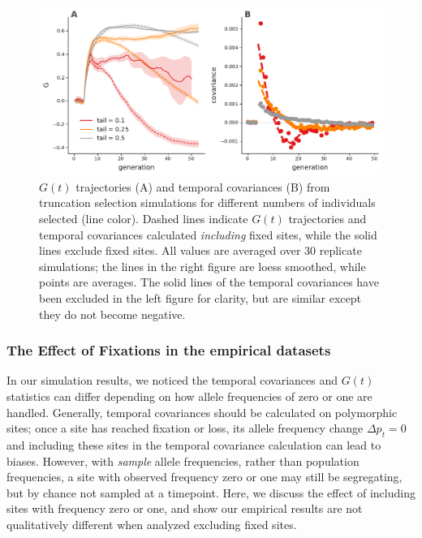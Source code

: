 \documentclass[11pt]{article}
\begin{document}
\begin{figure}[!ht]
  \centering
  \includegraphics[width=\textwidth]{figures/fig-both-trunc.pdf}

  \caption{$G(t)$ trajectories (A) and temporal covariances (B) from
    truncation selection simulations for different numbers of individuals
    selected (line color). Dashed lines indicate $G(t)$ trajectories and
    temporal covariances calculated \emph{including} fixed sites, while the
    solid lines exclude fixed sites. All values are averaged over 30 replicate
    simulations; the lines in the right figure are loess smoothed, while points
    are averages. The solid lines of the temporal covariances have been
    excluded in the left figure for clarity, but are similar except they do not
    become negative.}

    \label{suppfig:supp-trunc}
\end{figure}




\subsubsection{The Effect of Fixations in the empirical datasets}
\label{supp:fixation}

In our simulation results, we noticed the temporal covariances and $G(t)$
statistics can differ depending on how allele frequencies of zero or one are
handled. Generally, temporal covariances should be calculated on polymorphic
sites; once a site has reached fixation or loss, its allele frequency change
$\Delta p_t = 0$ and including these sites in the temporal covariance
calculation can lead to biases. However, with \emph{sample} allele frequencies,
rather than population frequencies, a site with observed frequency zero or one
may still be segregating, but by chance not sampled at a timepoint. Here, we
discuss the effect of including sites with frequency zero or one, and show our
empirical results are not qualitatively different when analyzed excluding fixed
sites.
\end{document}
